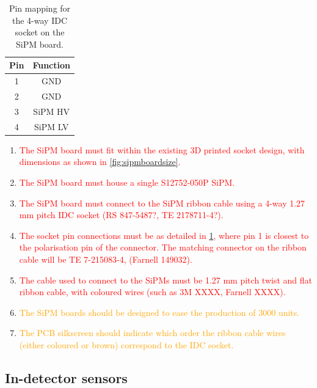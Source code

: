 \documentclass[a4paper]{article}
\newcommand{\must}[1]{\textcolor{red}{#1}}
\newcommand{\should}[1]{\textcolor{orange}{#1}}
\begin{document}
\begin{table}[h]
    \begin{center}
        \caption{Pin mapping for the 4-way IDC socket on the SiPM board.}
        \label{tab:IDC4waySiPM}
        \begin{tabular}{cc}
            \hline
            \hline
            Pin & Function \\
            \hline
            1 & GND \\
            2 & GND \\
            3 & SiPM HV \\
            4 & SiPM LV \\
            \hline
            \hline
        \end{tabular}
    \end{center}
\end{table}

\begin{enumerate}
    \item \must{The SiPM board must fit within the existing 3D printed socket design, with dimensions as shown in \cref{fig:sipmboardsize}.}
    \item \must{The SiPM board must house a single S12752-050P SiPM.}
    \item \must{The SiPM board must connect to the SiPM ribbon cable using a 4-way 1.27 mm pitch IDC socket (RS 847-5487?, TE 2178711-4?).}
    \item \must{The socket pin connections must be as detailed in \cref{tab:IDC4waySiPM}, where pin 1 is closest to the polarisation pin of the connector. The matching connector on the ribbon cable will be TE 7-215083-4, (Farnell 149032).}
    \item \must{The cable used to connect to the SiPMs must be 1.27 mm pitch twist and flat ribbon cable, with coloured wires (such as 3M XXXX, Farnell XXXX).}
    \item \should{The SiPM boards should be designed to ease the production of 3000 units.}
    \item \should{The PCB silkscreen should indicate which order the ribbon cable wires (either coloured or brown) correspond to the IDC socket.}
\end{enumerate}

\clearpage
\newpage
\subsection{In-detector sensors}
\end{document}
